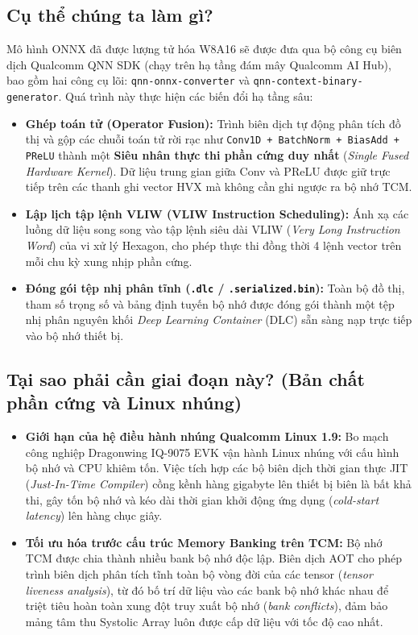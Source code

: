 \documentclass[11pt,a4paper,oneside,table]{report}
\begin{document}
\subsection{Cụ thể chúng ta làm gì?}
Mô hình ONNX đã được lượng tử hóa W8A16 sẽ được đưa qua bộ công cụ biên dịch Qualcomm QNN SDK (chạy trên hạ tầng đám mây Qualcomm AI Hub), bao gồm hai công cụ lõi: \texttt{qnn-onnx-converter} và \texttt{qnn-context-binary-generator}. Quá trình này thực hiện các biến đổi hạ tầng sâu:
\begin{itemize}
    \item \textbf{Ghép toán tử (Operator Fusion):} Trình biên dịch tự động phân tích đồ thị và gộp các chuỗi toán tử rời rạc như \texttt{Conv1D + BatchNorm + BiasAdd + PReLU} thành một \textbf{Siêu nhân thực thi phần cứng duy nhất} (\textit{Single Fused Hardware Kernel}). Dữ liệu trung gian giữa Conv và PReLU được giữ trực tiếp trên các thanh ghi vector HVX mà không cần ghi ngược ra bộ nhớ TCM.
    \item \textbf{Lập lịch tập lệnh VLIW (VLIW Instruction Scheduling):} Ánh xạ các luồng dữ liệu song song vào tập lệnh siêu dài VLIW (\textit{Very Long Instruction Word}) của vi xử lý Hexagon, cho phép thực thi đồng thời 4 lệnh vector trên mỗi chu kỳ xung nhịp phần cứng.
    \item \textbf{Đóng gói tệp nhị phân tĩnh (\texttt{.dlc} / \texttt{.serialized.bin}):} Toàn bộ đồ thị, tham số trọng số và bảng định tuyến bộ nhớ được đóng gói thành một tệp nhị phân nguyên khối \textit{Deep Learning Container} (DLC) sẵn sàng nạp trực tiếp vào bộ nhớ thiết bị.
\end{itemize}

\subsection{Tại sao phải cần giai đoạn này? (Bản chất phần cứng và Linux nhúng)}
\begin{itemize}
    \item \textbf{Giới hạn của hệ điều hành nhúng Qualcomm Linux 1.9:} Bo mạch công nghiệp Dragonwing IQ-9075 EVK vận hành Linux nhúng với cấu hình bộ nhớ và CPU khiêm tốn. Việc tích hợp các bộ biên dịch thời gian thực JIT (\textit{Just-In-Time Compiler}) cồng kềnh hàng gigabyte lên thiết bị biên là bất khả thi, gây tốn bộ nhớ và kéo dài thời gian khởi động ứng dụng (\textit{cold-start latency}) lên hàng chục giây.
    \item \textbf{Tối ưu hóa trước cấu trúc Memory Banking trên TCM:} Bộ nhớ TCM được chia thành nhiều bank bộ nhớ độc lập. Biên dịch AOT cho phép trình biên dịch phân tích tĩnh toàn bộ vòng đời của các tensor (\textit{tensor liveness analysis}), từ đó bố trí dữ liệu vào các bank bộ nhớ khác nhau để triệt tiêu hoàn toàn xung đột truy xuất bộ nhớ (\textit{bank conflicts}), đảm bảo mảng tâm thu Systolic Array luôn được cấp dữ liệu với tốc độ cao nhất.
\end{itemize}
\end{document}
